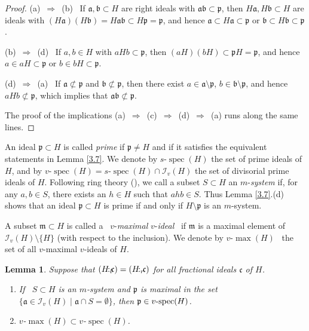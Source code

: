 \documentclass[a4paper]{amsart}
\newtheorem{lemma}[theorem]{Lemma}
\theoremstyle{definition}
\numberwithin{equation}{section}
\begin{document}
\begin{proof}
(a) \,$\Rightarrow$\, (b) \ If $\mathfrak a, \mathfrak b \subset H$
are right ideals with
           $\mathfrak a \mathfrak b \subset \mathfrak p$, then $H
           \mathfrak a, H \mathfrak b \subset H$ are ideals with $(H
           \mathfrak a)(H \mathfrak b) = H \mathfrak a \mathfrak b
           \subset H \mathfrak p = \mathfrak p$, and hence
           $\mathfrak a \subset H \mathfrak a \subset \mathfrak p$
           or $\mathfrak b \subset H \mathfrak b \subset \mathfrak
           p$.

\smallskip
(b) \,$\Rightarrow$\, (d) \ If $a, b \in H$ with $aHb \subset
\mathfrak p$, then $(aH)(bH)  \subset \mathfrak p H = \mathfrak p$,
and hence $a \in aH \subset \mathfrak p$ or $b \in bH \subset
\mathfrak p$.

\smallskip
(d) \,$\Rightarrow$\, (a) \ If $\mathfrak a \not\subset \mathfrak p$
and $\mathfrak b \not\subset \mathfrak p$, then there exist $a \in
\mathfrak a \setminus \mathfrak p$, $b \in \mathfrak b \setminus
\mathfrak p$, and hence $aHb \not\subset \mathfrak p$, which implies
that $\mathfrak a \mathfrak b \not\subset \mathfrak p$.

\smallskip
The proof of the implications (a) \,$\Rightarrow$\, (c)
\,$\Rightarrow$\, (d) \,$\Rightarrow$\, (a) runs along the same
lines.
\end{proof}

\smallskip
An ideal $\mathfrak p \subset H$ is called {\it prime} if $\mathfrak p \ne  H$ and if it
satisfies the equivalent statements in Lemma \ref{3.7}. We denote by
$s$-$\operatorname{spec} (H)$ the set of prime ideals of $H$, and by $v$-$\operatorname{spec}
(H) = s$-$\operatorname{spec} (H) \cap \mathcal I_v (H)$  the set of divisorial
prime ideals of $H$. Following ring theory (\cite[Definition
10.3]{La01a}), we call a subset $S \subset H$ an $m$-{\it system}
if, for any $a, b \in S$, there exists an $h \in H$ such that $ahb
\in S$. Thus Lemma \ref{3.7}.(d) shows that an ideal $\mathfrak p
\subset H$ is prime if and only if $H \setminus \mathfrak p$ is an
$m$-system.

A subset $\mathfrak m \subset H$ is called a \ $v$-{\it maximal}
$v$-{\it ideal} \ if $\mathfrak m$ is a maximal element of $\mathcal
I_v(H) \setminus \{H\}$ (with respect to the inclusion).
            We denote by $v$-$\max(H)$ \ the set of all $v$-maximal $v$-ideals of $H$.

\medskip
\begin{lemma} \label{3.8}
Suppose that $(H {\negthinspace :_l \negthinspace} \mathfrak c) = (H {\negthinspace :_r \negthinspace} \mathfrak c)$ for all
fractional ideals $\mathfrak c$ of $H$.
\begin{enumerate}
\item If \ $S \subset H$ is an $m$-system and $\mathfrak p$ is maximal
      in the set $\{ \mathfrak a \in \mathcal I_v(H) \mid \mathfrak a
      \cap S = \emptyset\}$, then $\mathfrak p \in v\text{\rm -spec}(H)$.

\smallskip
\item $v$-$\max (H) \subset v$-$\operatorname{spec}(H)$.
\end{enumerate}
\end{lemma}
\end{document}
